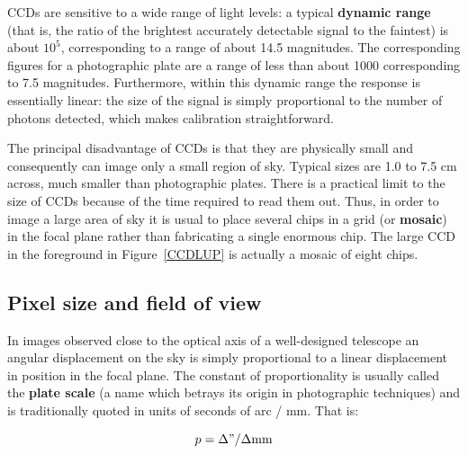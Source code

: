 \documentclass[twoside,11pt]{article}
\newcommand{\xlabel}[1]{}
\begin{document}
CCDs are sensitive to a wide range of light levels: a typical {\bf
dynamic range} (that is, the ratio of the brightest accurately detectable
signal to the faintest) is about $10^{5}$, corresponding to a range of
about 14.5 magnitudes.  The corresponding figures for a photographic plate
are a range of less than about 1000 corresponding to 7.5 magnitudes.
Furthermore, within this dynamic range the response is essentially linear:
the size of the signal is simply proportional to the number of photons
detected, which makes calibration straightforward.

The principal disadvantage of CCDs is that they are physically small and
consequently can image only a small region of sky.  Typical sizes are
1.0 to 7.5 cm across, much smaller than photographic plates.  There is
a practical limit to the size of CCDs because of the time required to read
them out.  Thus, in order to image a large area of sky it is usual to
place several chips in a grid (or {\bf mosaic}) in the focal plane rather
than fabricating a single enormous chip.  The large CCD in the foreground
in Figure~\ref{CCDLUP} is actually a mosaic of eight chips.

\subsection{\xlabel{PLATESCALE}Pixel size and field of view}

In images observed close to the optical axis of a well-designed telescope
an angular displacement on the sky is simply proportional to a linear
displacement in position in the focal plane.  The constant of
proportionality is usually called the {\bf plate scale} (a name which
betrays its origin in photographic techniques) and is traditionally
quoted in units of seconds of arc / mm.  That is:

\begin{equation}
p = \Delta " / \Delta {\rm mm}  \label{PSCALE}
\end{equation}
\end{document}
